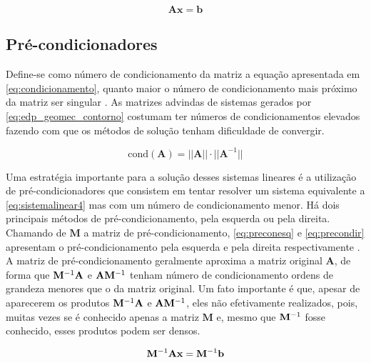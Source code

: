 \begin{equation} \label{eq:sistemalinear4}
    \mathbf{Ax = b}
\end{equation}

\subsection{Pré-condicionadores}

Define-se como número de condicionamento da matriz a equação apresentada em \eqref{eq:condicionamento}, quanto maior o número de condicionamento mais próximo da matriz ser singular . As matrizes advindas de sistemas gerados por \eqref{eq:edp_geomec_contorno} costumam ter números de condicionamentos elevados fazendo com que os métodos de solução tenham dificuldade de convergir.

\begin{equation} \label{eq:condicionamento}
\text{cond}(\mathbf{A}) = || \mathbf{A} || \cdot || \mathbf{A}^{-1} ||
\end{equation}


Uma estratégia importante para a solução desses sistemas lineares é a utilização de pré-condicionadores que consistem em tentar resolver um sistema equivalente a \eqref{eq:sistemalinear4} mas com um número de condicionamento menor. Há dois principais métodos de pré-condicionamento, pela esquerda ou pela direita. Chamando de $\mathbf{M}$ a matriz de pré-condicionamento, \eqref{eq:preconesq} e \eqref{eq:precondir} apresentam o pré-condicionamento pela esquerda e pela direita respectivamente . A matriz de pré-condicionamento geralmente aproxima a matriz original $\mathbf{A}$, de forma que $\mathbf{M}^{-1} \mathbf{A}$ e $\mathbf{A} \mathbf{M}^{-1}$ tenham número de condicionamento ordens de grandeza menores que o da matriz original. Um fato importante é que, apesar de aparecerem os produtos $\mathbf{M}^{-1} \mathbf{A}$ e $\mathbf{A} \mathbf{M}^{-1}$, eles não efetivamente realizados, pois, muitas vezes se é conhecido apenas a matriz $\mathbf{M}$ e, mesmo que $\mathbf{M}^{-1}$ fosse conhecido, esses produtos podem ser densos.  


\begin{equation} \label{eq:preconesq}
\mathbf{M}^{-1} \mathbf{A} \mathbf{x}= \mathbf{M}^{-1} \mathbf{b}
\end{equation}

